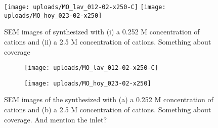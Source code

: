 \begin{figure}
	\centering
	\texttt{[image: uploads/MO\_lav\_012-02-x250-C]}
	\texttt{[image: uploads/MO\_hoy\_023-02-x250]} 
	\caption{SEM images of synthesized  with (i) a 0.252 M concentration of cations and (ii) a 2.5 M concentration of cations. Something about coverage}
	\label{fig:my_label}
\end{figure}


\begin{figure}
    \begin{subfigure}[t]{0.02\textwidth} \raisebox{6cm}{a)} \end{subfigure}
	\begin{subfigure}[b]{0.48\textwidth}
	\texttt{[image: uploads/MO\_lav\_012-02-x250-C]}
	\end{subfigure}
    \begin{subfigure}[t]{0.02\textwidth}
    \raisebox{6cm}{b)}
    \end{subfigure}
	\begin{subfigure}[b]{0.48\textwidth}
	\texttt{[image: uploads/MO\_hoy\_023-02-x250]} 
	\end{subfigure}
	\caption{SEM images of the synthesized  with (a) a 0.252 M concentration of cations and (b) a 2.5 M concentration of cations. Something about coverage. And mention the inlet?}
	\label{fig:MnO2_diff}
\end{figure}


